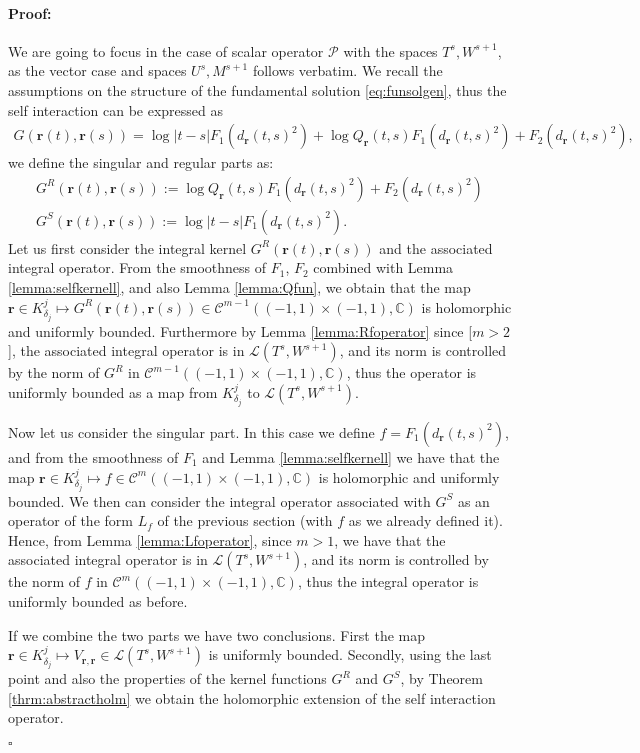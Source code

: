 \documentclass{article}
\newenvironment{proof}{\paragraph{Proof:}}{\hfill$\square$}
\newcommand{\todo}[1]{{\color{red}[#1]}}
\newcommand{\IC}{{\mathbb C}}
\newcommand{\cmspace}[3]{\mathcal{C}^{#1} \left( #2, #3 \right)}
\newcommand{\cP}{\mathcal{P}}
\newcommand{\br}{\bm{r}}
\newcommand{\iinterv}{(-1,1)\times(-1,1)}
\begin{document}
\begin{proof} 
We are going to focus in the case of scalar operator $\cP$ with the spaces $T^s,W^{s+1}$, as the vector case and spaces $U^s,M^{s+1}$ follows verbatim. We recall the assumptions on the structure of the fundamental solution \eqref{eq:funsolgen}, thus the self interaction can be expressed as 
\begin{align*}
G(\br(t),\br(s)) = \log|t-s| F_1(d_{\br}(t,s)^2)+ \log Q_{\br}(t,s)F_1(d_{\br}(t,s)^2) + F_2(d_{\br}(t,s)^2),
\end{align*}
we define the singular and regular parts as: 
\begin{align*}
G^R(\br(t),\br(s)) := \log Q_{\br}(t,s)F_1(d_{\br}(t,s)^2) + F_2(d_{\br}(t,s)^2)\\
G^S(\br(t),\br(s)) := \log|t-s| F_1(d_{\br}(t,s)^2).
\end{align*}
Let us first consider the integral kernel $G^R(\br(t),\br(s))$ and the associated integral operator. From the smoothness of $F_1$, $F_2$ combined with Lemma \ref{lemma:selfkernell}, and also Lemma \ref{lemma:Qfun}, we obtain that the map $\br \in K^j_{\delta_j} \mapsto G^R(\br(t),\br(s)) \in \cmspace{m-1}{\iinterv}{\IC}$ is holomorphic and uniformly bounded. Furthermore by Lemma \ref{lemma:Rfoperator} since \todo{$m>2$}, the associated integral operator is in $\mathcal{L}(T^s,W^{s+1})$, and its norm is controlled by the norm of $G^R$ in $\cmspace{m-1}{\iinterv}{\IC}$, thus the operator is uniformly bounded as a map from $K^j_{\delta_j}$ to $\mathcal{L}(T^s,W^{s+1})$.

Now let us consider the singular part. In this case we define $f =F_1(d_{\br}(t,s)^2)$, and from the smoothness of $F_1$ and Lemma \ref{lemma:selfkernell} we have that the map $\br \in K^j_{\delta_j} \mapsto f \in \cmspace{m}{\iinterv}{\IC}$ is holomorphic and uniformly bounded. We then can consider the integral operator associated with $G^S$ as an operator of the form $L_f$ of the previous section (with $f$ as we already defined it). Hence, from Lemma \ref{lemma:Lfoperator}, since $m>1$, we have that the associated integral operator is in $\mathcal{L}(T^s,W^{s+1})$, and its norm is controlled by the norm of $f$ in $\cmspace{m}{\iinterv}{\IC}$, thus the integral operator is uniformly bounded as before.

If we combine the two parts we have two conclusions. First the map $\br \in K^j_{\delta_j} \mapsto V_{\br,\br} \in \mathcal{L}(T^s,W^{s+1})$ is uniformly bounded. Secondly, using the last point and also the properties of the kernel functions $G^R$ and $G^S$, by Theorem \ref{thrm:abstractholm} we obtain the holomorphic extension of the self interaction operator. 


\end{proof}
\end{document}
